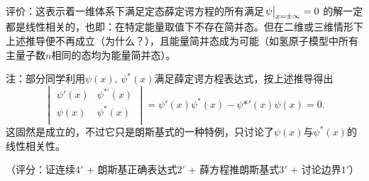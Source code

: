 \begin{enumerate}[label=1.\Alph*, leftmargin=-0.5mm]
{\color{red} 评价：这表示着一维体系下满足定态薛定谔方程的所有满足$\eval{\psi}_{x=\pm \infty} = 0$
的解一定都是线性相关的，也即：在特定能量取值下不存在简并态。但在二维或三维情形下上述推导便不再成立（为什么？），且能量简并态成为可能（如氢原子模型中所有主量子数$n$相同的态均为能量简并态）。}

注：部分同学利用$\psi(x),\, \psi^*(x)$满足薛定谔方程表达式，按上述推导得出
\[\begin{vmatrix}
\psi'(x) & \psi^{*\prime}(x)\\
\psi(x) & \psi^*(x)\\
\end{vmatrix} = 
\psi'(x)\psi^*(x) - \psi{*\prime}(x)\psi(x) = 0.\]
这固然是成立的，不过它只是朗斯基式的一种特例，只讨论了$\psi(x)$与$\psi^*(x)$的线性相关性。

（评分：证连续$4'$ + 朗斯基正确表达式$2'$ + 薛方程推朗斯基式$3'$ + 讨论边界$1'$）

\end{enumerate}